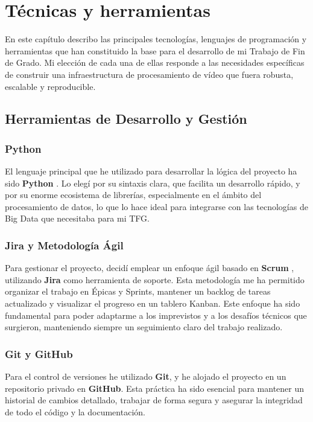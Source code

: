 
\chapter{Técnicas y herramientas}
\label{chap:tecnicas_herramientas}

En este capítulo describo las principales tecnologías, lenguajes de programación y herramientas que han constituido la base para el desarrollo de mi Trabajo de Fin de Grado. Mi elección de cada una de ellas responde a las necesidades específicas de construir una infraestructura de procesamiento de vídeo que fuera robusta, escalable y reproducible.

\section{Herramientas de Desarrollo y Gestión}
\label{sec:herramientas_desarrollo}

\subsection{Python}
El lenguaje principal que he utilizado para desarrollar la lógica del proyecto ha sido \textbf{Python} \cite{python_software_foundation}. Lo elegí por su sintaxis clara, que facilita un desarrollo rápido, y por su enorme ecosistema de librerías, especialmente en el ámbito del procesamiento de datos, lo que lo hace ideal para integrarse con las tecnologías de Big Data que necesitaba para mi TFG.

\subsection{Jira y Metodología Ágil}
Para gestionar el proyecto, decidí emplear un enfoque ágil basado en \textbf{Scrum} \cite{trigas2012metodologia}, utilizando \textbf{Jira} \cite{atlassian_jira} como herramienta de soporte. Esta metodología me ha permitido organizar el trabajo en Épicas y Sprints, mantener un backlog de tareas actualizado y visualizar el progreso en un tablero Kanban. Este enfoque ha sido fundamental para poder adaptarme a los imprevistos y a los desafíos técnicos que surgieron, manteniendo siempre un seguimiento claro del trabajo realizado.

\subsection{Git y GitHub}
Para el control de versiones he utilizado \textbf{Git}, y he alojado el proyecto en un repositorio privado en \textbf{GitHub}. Esta práctica ha sido esencial para mantener un historial de cambios detallado, trabajar de forma segura y asegurar la integridad de todo el código y la documentación.

